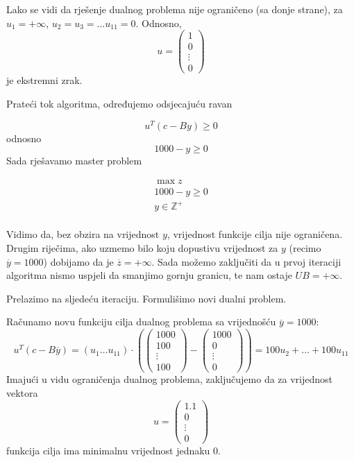 \documentclass[a4paper, utf8, 11pt, colorlinks]{book}
\begin{document}
Lako se vidi da rješenje dualnog problema nije ograničeno (sa donje strane), za $u_1 = +\infty$, $u_2 = u_3=\ldots u_{11}=0$.
Odnosno, 
$$u=\left(\begin{array}{c}
 1 \\
	0 \\
	\vdots \\
	0
\end{array}\right)$$ je ekstremni zrak.

Prateći tok algoritma, određujemo odsjecajuću ravan

$$u^{T}(c-By)\geqslant 0$$
odnosno
$$1000-y\geqslant 0$$
Sada rješavamo master problem

$$
\begin{aligned}
	\max z\\
	1000-y\geqslant 0\\
	y\in\mathbb{Z}^+\\	
	\end{aligned}
$$

Vidimo da, bez obzira na vrijednost $y$, vrijednost funkcije cilja nije ograničena.
Drugim riječima, ako uzmemo bilo koju dopustivu vrijednost za $y$ (recimo $\overline{y}=1000$) dobijamo da je $\overline{z} = +\infty$. Sada možemo zaključiti da u prvoj iteraciji algoritma nismo uspjeli da smanjimo gornju granicu, te nam ostaje $UB = +\infty$.

 Prelazimo na sljedeću iteraciju. Formulišimo novi dualni problem.
 
  Računamo novu funkciju cilja dualnog problema sa vrijednošću $\overline{y}=1000$:
 $$
 u^T (c-B\overline{y})=(u_1\ldots u_{11})\cdot \left(\left(\begin{array}{c}
 	1000 \\
 	100 \\
 	\vdots \\
 	100
 \end{array}\right)-\left(\begin{array}{c}
 	1000 \\
 	0 \\
 	\vdots \\
 	0
 \end{array}\right)\right) = 100u_2+\ldots+100u_{11}
 $$
 Imajući u vidu ograničenja dualnog problema, zaključujemo da za vrijednost vektora $$u=\left(\begin{array}{c}
 	1.1 \\
 	0 \\
 	\vdots \\
 	0
 \end{array}\right)$$
funkcija cilja ima minimalnu vrijednost jednaku 0.
\end{document}

